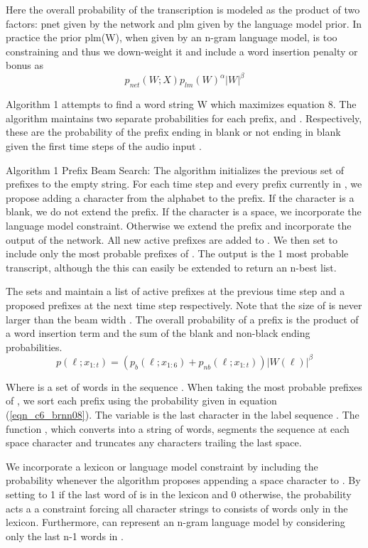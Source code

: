 Here the overall probability of the transcription is modeled as the product of two factors: pnet given by the network and plm given by the language model prior. In practice the prior plm(W), when given by an n-gram language model, is too constraining and thus we down-weight it and include a word insertion penalty or bonus as
\begin{equation}
p_{net}(W;X)p_{lm}(W)^\alpha|W|^\beta
\label{eqn_c6_brnn07}
\end{equation}

Algorithm 1 attempts to find a word string W which maximizes equation 8. The algorithm maintains two separate probabilities for each prefix,  and . Respectively, these are the probability of the prefix ending in blank or not ending in blank given the first  time steps of the audio input .

Algorithm 1 Prefix Beam Search: The algorithm initializes the previous set of prefixes  to the empty string. For each time step and every prefix  currently in , we propose adding a character from the alphabet  to the prefix. If the character is a blank, we do not extend the prefix. If the character is a space, we incorporate the language model constraint. Otherwise we extend the prefix and incorporate the output of the network. All new active prefixes are added to . We then set  to include only the  most probable prefixes of . The output is the 1 most probable transcript, although the this can easily be extended to return an n-best list.

The sets  and  maintain a list of active prefixes at the previous time step and a proposed prefixes at the next time step respectively. Note that the size of  is never larger than the beam width . The overall probability of a prefix is the product of a word insertion term and the sum of the blank and non-black ending probabilities.
\begin{equation}
p(\ell;x_{1:t})=(p_b(\ell;x_{1:6})+p_{nb}(\ell;x_{1:t}))|W(\ell)|^\beta
\label{eqn_c6_brnn08}
\end{equation}

Where  is a set of words in the sequence . When taking the  most probable prefixes of , we sort each prefix using the probability given in equation (\ref{eqn_c6_brnn08}).
The variable  is the last character in the label sequence . The function , which converts  into a string of words, segments the sequence  at each space character and truncates any characters trailing the last space.

We incorporate a lexicon or language model constraint by including the probability  whenever the algorithm proposes appending a space character to . By setting  to 1 if the last word of  is in the lexicon and 0 otherwise, the probability acts a a constraint forcing all character strings to consists of words only in the lexicon.  Furthermore,  can represent an n-gram language model by considering only the last n-1 words in .

